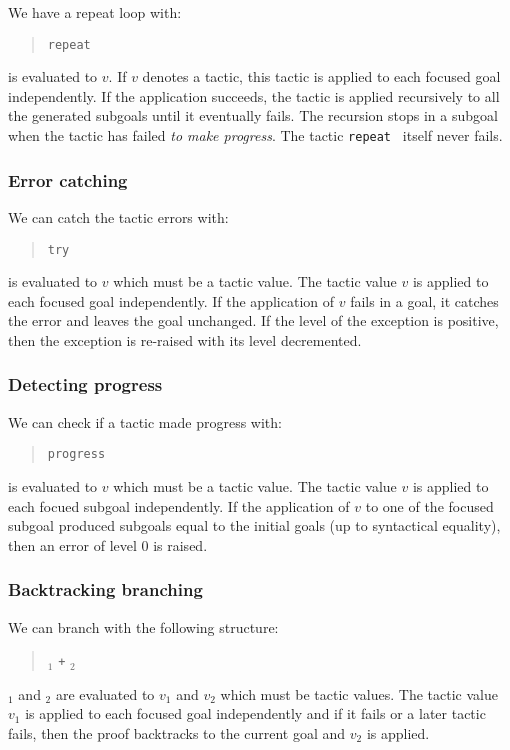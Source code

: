 We have a repeat loop with:
\begin{quote}
{\tt repeat} {\tacexpr}
\end{quote}
{\tacexpr} is evaluated to $v$. If $v$ denotes a tactic, this tactic
is applied to each focused goal independently. If the application
succeeds, the tactic is applied recursively to all the generated subgoals
until it eventually fails.  The recursion stops in a subgoal when the
tactic has failed \emph{to make progress}.  The tactic {\tt repeat
  {\tacexpr}} itself never fails.

\subsubsection[Error catching]{Error catching
}

We can catch the tactic errors with:
\begin{quote}
{\tt try} {\tacexpr}
\end{quote}
{\tacexpr} is evaluated to $v$ which must be a tactic value.
The tactic value $v$ is
applied to each focused goal independently. If the application of $v$
fails in a goal, it catches the error and leaves the goal
unchanged. If the level of the exception is positive, then the
exception is re-raised with its level decremented.

\subsubsection[Detecting progress]{Detecting progress}

We can check if a tactic made progress with:
\begin{quote}
{\tt progress} {\tacexpr}
\end{quote}
{\tacexpr} is evaluated to $v$ which must be a tactic value.
The tactic value $v$ is
applied to each focued subgoal independently. If the application of
$v$ to one of the focused subgoal produced subgoals equal to the
initial goals (up to syntactical equality), then an error of level 0
is raised.

\ErrMsg {}

\subsubsection[Backtracking branching]{Backtracking branching\tacindex{$+$}
}

We can branch with the following structure:
\begin{quote}
{\tacexpr}$_1$ {\tt +} {\tacexpr}$_2$
\end{quote}
{\tacexpr}$_1$ and {\tacexpr}$_2$ are evaluated to $v_1$ and
$v_2$ which must be tactic values. The tactic value $v_1$ is applied to each
focused goal independently and if it fails or a later tactic fails,
then the proof backtracks to the current goal and $v_2$ is applied.


